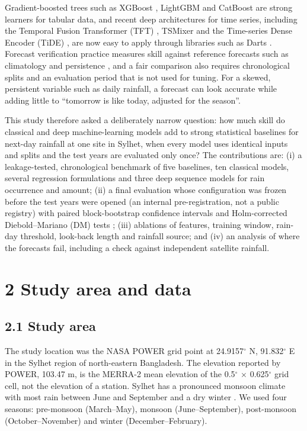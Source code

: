 \documentclass[
]{article}
\begin{document}
Gradient-boosted trees such as XGBoost \citep{chen2016xgboost}, LightGBM \citep{ke2017lightgbm} and CatBoost \citep{prokhorenkova2018} are strong learners for tabular data, and recent deep architectures for time series, including the Temporal Fusion Transformer (TFT) \citep{lim2021}, TSMixer \citep{chen2023tsmixer} and the Time-series Dense Encoder (TiDE) \citep{das2023tide}, are now easy to apply through libraries such as Darts \citep{herzen2022}. Forecast verification practice measures skill against reference forecasts such as climatology and persistence \citep{wilks2019}, and a fair comparison also requires chronological splits and an evaluation period that is not used for tuning. For a skewed, persistent variable such as daily rainfall, a forecast can look accurate while adding little to ``tomorrow is like today, adjusted for the season''.

This study therefore asked a deliberately narrow question: how much skill do classical and deep machine-learning models add to strong statistical baselines for next-day rainfall at one site in Sylhet, when every model uses identical inputs and splits and the test years are evaluated only once? The contributions are: (i) a leakage-tested, chronological benchmark of five baselines, ten classical models, several regression formulations and three deep sequence models for rain occurrence and amount; (ii) a final evaluation whose configuration was frozen before the test years were opened (an internal pre-registration, not a public registry) with paired block-bootstrap confidence intervals and Holm-corrected Diebold--Mariano (DM) tests \citep{diebold1995, harvey1997}; (iii) ablations of features, training window, rain-day threshold, look-back length and rainfall source; and (iv) an analysis of where the forecasts fail, including a check against independent satellite rainfall.

\hypertarget{study-area-and-data}{%
\section{2 Study area and data}\label{study-area-and-data}}

\hypertarget{study-area}{%
\subsection{2.1 Study area}\label{study-area}}

The study location was the NASA POWER grid point at 24.9157$^{\circ}$ N, 91.832$^{\circ}$ E in the Sylhet region of north-eastern Bangladesh. The elevation reported by POWER, 103.47 m, is the MERRA-2 mean elevation of the 0.5$^{\circ}$ $\times$ 0.625$^{\circ}$ grid cell, not the elevation of a station. Sylhet has a pronounced monsoon climate with most rain between June and September and a dry winter \citep{shahid2010}. We used four seasons: pre-monsoon (March--May), monsoon (June--September), post-monsoon (October--November) and winter (December--February).
\end{document}
